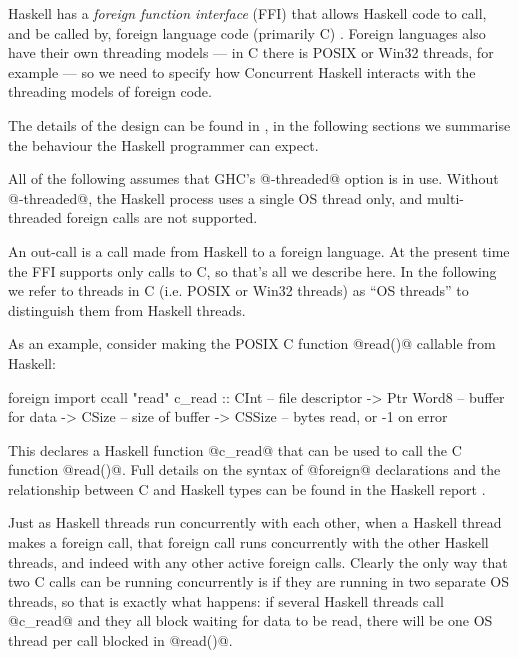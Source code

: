 
Haskell has a \emph{foreign function interface} (FFI) that allows
Haskell code to call, and be called by, foreign language code
(primarily C) \cite{haskell2010}.  Foreign languages also have their
own threading models --- in C there is POSIX or Win32 threads, for
example --- so we need to specify how Concurrent Haskell interacts
with the threading models of foreign code.

The details of the design can be found in \citet{conc-ffi}, in the
following sections we summarise the behaviour the Haskell programmer
can expect.

All of the following assumes that GHC's @-threaded@ option is in use.
Without @-threaded@, the Haskell process uses a single OS thread only,
and multi-threaded foreign calls are not supported.


An out-call is a call made from Haskell to a foreign language.  At the
present time the FFI supports only calls to C, so that's all we
describe here.  In the following we refer to threads in C (i.e. POSIX
or Win32 threads) as ``OS threads'' to distinguish them from Haskell
threads.

As an example, consider making the POSIX C function @read()@ callable
from Haskell:

\begin{haskell}
foreign import ccall "read"
   c_read :: CInt      -- file descriptor
          -> Ptr Word8 -- buffer for data
          -> CSize     -- size of buffer
          -> CSSize    -- bytes read, or -1 on error
\end{haskell}

\noindent This declares a Haskell function @c_read@ that can be used
to call the C function @read()@.  Full details on the syntax of
@foreign@ declarations and the relationship between C and Haskell
types can be found in the Haskell report \cite{haskell2010}.

Just as Haskell threads run concurrently with each other, when a
Haskell thread makes a foreign call, that foreign call runs
concurrently with the other Haskell threads, and indeed with any other
active foreign calls.  Clearly the only way that two C calls can be
running concurrently is if they are running in two separate OS
threads, so that is exactly what happens: if several Haskell threads
call @c_read@ and they all block waiting for data to be read, there
will be one OS thread per call blocked in @read()@.

